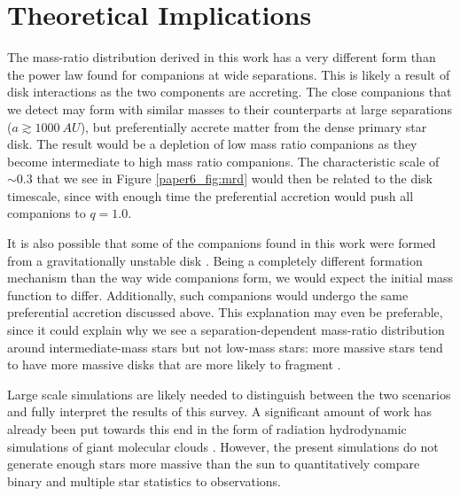 \documentclass{utthesis}
\begin{document}
\section{Theoretical Implications}

The mass-ratio distribution derived in this work has a very different form than the power law found for companions at wide separations. This is likely a result of disk interactions as the two components are accreting. The close companions that we detect may form with similar masses to their counterparts at large separations ($a \gtrsim 1000\ AU$), but preferentially accrete matter from the dense primary star disk. The result would be a depletion of low mass ratio companions as they become intermediate to high mass ratio companions. The characteristic scale of $\sim 0.3$ that we see in Figure \ref{paper6_fig:mrd} would then be related to the disk timescale, since with enough time the preferential accretion would push all companions to $q = 1.0$. 

It is also possible that some of the companions found in this work were formed from a gravitationally unstable disk \citep[e.g.][]{Kratter2006, Stamatellos2011}. Being a completely different formation mechanism than the way wide companions form, we would expect the initial mass function to differ. Additionally, such companions would undergo the same preferential accretion discussed above. This explanation may even be preferable, since it could explain why we see a separation-dependent mass-ratio distribution around intermediate-mass stars but not low-mass stars: more massive stars tend to have more massive disks \citep{Andrews2013} that are more likely to fragment \citep{Kratter2010}.

Large scale simulations are likely needed to distinguish between the two scenarios and fully interpret the results of this survey. A significant amount of work has already been put towards this end in the form of radiation hydrodynamic simulations of giant molecular clouds \citep{Bate2012, Krumholz2012}. However, the present simulations do not generate enough stars more massive than the sun to quantitatively compare binary and multiple star statistics to observations. 








\backmatter

\printindex

\cleardoublepage
{}

\end{document}
